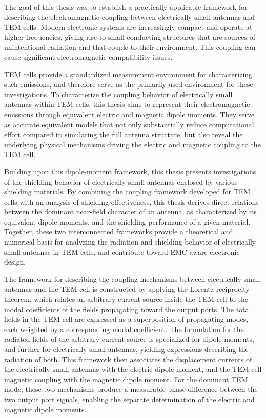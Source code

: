 The goal of this thesis was to establish a practically applicable framework for describing the electromagnetic coupling between electrically small antennas and TEM cells. Modern electronic systems are increasingly compact and operate at higher frequencies, giving rise to small conducting structures that are sources of unintentional radiation and that couple to their environment. This coupling can cause significant electromagnetic compatibility issues. 

TEM cells provide a standardized measurement environment for characterizing such emissions, and therefore serve as the primarily used environment for these investigations. To characterize the coupling behavior of electrically small antennas within TEM cells, this thesis aims to represent their electromagnetic emissions through equivalent electric and magnetic dipole moments. They serve as accurate equivalent models that not only substantially reduce computational effort compared to simulating the full antenna structure, but also reveal the underlying physical mechanisms driving the electric and magnetic coupling to the TEM cell.

Building upon this dipole-moment framework, this thesis presents investigations of the shielding behavior of electrically small antennas enclosed by various shielding materials. By combining the coupling framework developed for TEM cells with an analysis of shielding effectiveness, this thesis derives direct relations between the dominant near-field character of an antenna, as characterized by its equivalent dipole moments, and the shielding performance of a given material. Together, these two interconnected frameworks provide a theoretical and numerical basis for analyzing the radiation and shielding behavior of electrically small antennas in TEM cells, and contribute toward EMC-aware electronic design.

The framework for describing the coupling mechanisms between electrically small antennas and the TEM cell is constructed by applying the Lorentz reciprocity theorem, which relates an arbitrary current source inside the TEM cell to the modal coefficients of the fields propagating toward the output ports. The total fields in the TEM cell are expressed as a superposition of propagating modes, each weighted by a corresponding modal coefficient. The formulation for the radiated fields of the arbitrary current source is specialized for dipole moments, and further for electrically small antennas, yielding expressions describing the radiation of both. This framework then associates the displacement currents of the electrically small antennas with the electric dipole moment, and the TEM cell magnetic coupling with the magnetic dipole moment. For the dominant TEM mode, these two mechanisms produce a measurable phase difference between the two output port signals, enabling the separate determination of the electric and magnetic dipole moments.

